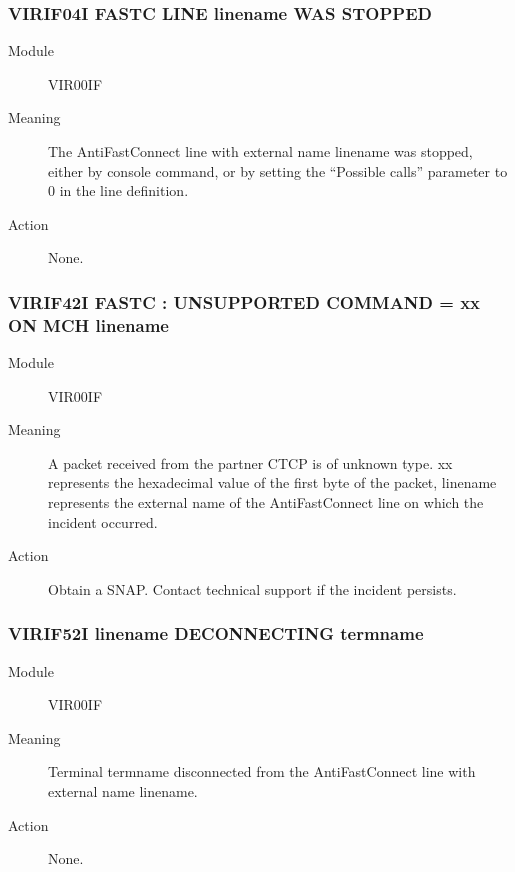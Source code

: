 \documentclass[letterpaper,10pt,english]{sphinxmanual}
\begin{document}
\subsubsection{VIRIF04I FASTC LINE linename WAS STOPPED}
\label{\detokenize{messages:virif04i-fastc-line-linename-was-stopped}}\begin{description}
\item[{Module}] \leavevmode
VIR00IF

\item[{Meaning}] \leavevmode
The AntiFastConnect line with external name linename was stopped, either by console command, or by setting the “Possible calls” parameter to 0 in the line definition.

\item[{Action}] \leavevmode
None.

\end{description}


\subsubsection{VIRIF42I FASTC : UNSUPPORTED COMMAND = xx ON MCH linename}
\label{\detokenize{messages:virif42i-fastc-unsupported-command-xx-on-mch-linename}}\begin{description}
\item[{Module}] \leavevmode
VIR00IF

\item[{Meaning}] \leavevmode
A packet received from the partner CTCP is of unknown type. xx represents the hexadecimal value of the first byte of the packet, linename represents the external name of the AntiFastConnect line on which the incident occurred.

\item[{Action}] \leavevmode
Obtain a SNAP. Contact technical support if the incident persists.

\end{description}


\subsubsection{VIRIF52I linename DECONNECTING termname}
\label{\detokenize{messages:virif52i-linename-deconnecting-termname}}\begin{description}
\item[{Module}] \leavevmode
VIR00IF

\item[{Meaning}] \leavevmode
Terminal termname disconnected from the AntiFastConnect line with external name linename.

\item[{Action}] \leavevmode
None.

\end{description}
\end{document}

